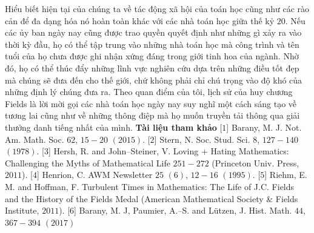 \begin{multicols}{2}
	\vskip 0.05cm
	Hiểu biết hiện tại của chúng ta về tác động xã hội của toán học cũng như các rào cản để đa dạng hóa nó hoàn toàn khác với các nhà toán học giữa thế kỷ $20$. Nếu các ủy ban ngày nay cũng được trao quyền quyết định như những gì xảy ra vào thời kỳ đầu, họ có thể tập trung vào những nhà toán học mà công trình và tên tuổi của họ chưa được ghi nhận xứng đáng trong giới tinh hoa của ngành. Nhờ đó, họ có thể thúc đẩy những lĩnh vực nghiên cứu dựa trên những điều tốt đẹp mà chúng sẽ đưa đến cho thế giới, chứ không phải chỉ chú trọng vào độ khó của những định lý chúng đưa ra.
	\vskip 0.05cm
	Theo quan điểm của tôi, lịch sử của huy chương Fields là lời mời gọi  các nhà toán học ngày nay suy nghĩ một cách sáng tạo về tương lai cũng như về những thông điệp mà họ muốn truyền tải thông qua giải thưởng danh tiếng nhất của mình.
	\vskip 0.05cm
	\textbf{\color{lichsutoanhoc}Tài liệu tham khảo}
	\vskip 0.05cm
	[$1$] Barany, M. J. Not. Am. Math. Soc. $62$, $15-20$ $(2015)$.
	\vskip 0.05cm
	[$2$] Stern, N. Soc. Stud. Sci. $8$, $127-140$ $(1978)$.
	\vskip 0.05cm
	[$3$] Hersh, R. and John--Steiner, V. Loving + Hating Mathematics: Challenging the Myths of Mathematical Life $251-272$ (Princeton Univ. Press, $2011$). 
	\vskip 0.05cm
	[$4$] Henrion, C. AWM Newsletter $25$ $(6)$, $12-16$ $(1995)$.
	\vskip 0.05cm
	[$5$] Riehm, E. M. and Hoffman, F. Turbulent Times in Mathematics: The Life of J.C. Fields and the History of the Fields Medal (American Mathematical Society \& Fields Institute, $2011$).
	\vskip 0.05cm
	[$6$] Barany, M. J, Paumier, A.--S. and Lützen, J. Hist. Math. $44$, $367-394$ $(2017)$
\end{multicols}
%
%
